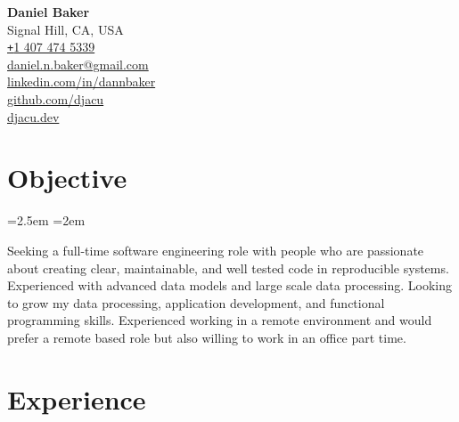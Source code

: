 \documentclass{article}
\newenvironment
{blockquote}
{
    \par
    \medskip
    \leftskip=2.5em
    \rightskip=2em
    \noindent
    \ignorespaces
}
{\par\medskip}
\begin{document}
\begin{flushleft}
    \textbf{\Huge Daniel Baker} \vspace{0.5em} \\
    Signal Hill, CA, USA \\
    \href{tel:14074745339}{\texttt{+}1 407 474 5339} \\
    \href{mailto:daniel.n.baker@gmail.com}{daniel.n.baker@gmail.com} \\
    \href{https://www.linkedin.com/in/dannbaker/}{linkedin.com/in/dannbaker} \\
    \href{https://github.com/djacu}{github.com/djacu} \\
    \href{https://djacu.dev/}{djacu.dev}
\end{flushleft}

\section{Objective}

\begin{blockquote}
    Seeking a full-time software engineering role with people who are passionate about creating clear, maintainable, and well tested code in reproducible systems.
    Experienced with advanced data models and large scale data processing.
    Looking to grow my data processing, application development, and functional programming skills.
    Experienced working in a remote environment and would prefer a remote based role but also willing to work in an office part time.
\end{blockquote}

\section{Experience}
\end{document}

